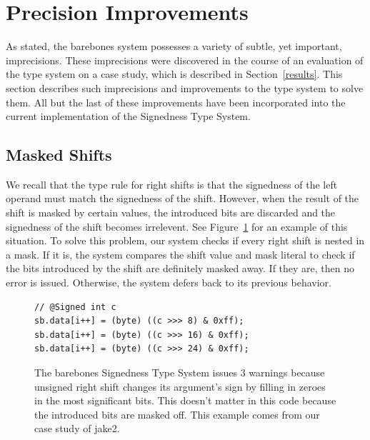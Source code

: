 \newpage
\section{Precision Improvements} \label{precision}

As stated, the barebones system possesses
a variety of subtle, yet important, imprecisions.
These imprecisions were discovered in the course of
an evaluation of the type system on a case study, which is described in
Section~\ref{results}. This section describes such imprecisions and improvements
to the type system to solve them. All but the last of these improvements have
been incorporated into the current implementation of the Signedness Type System.

\subsection{Masked Shifts}
We recall that the type rule for right shifts is that the signedness of the left
operand must match the signedness of the shift. However, when the result of the
shift is masked by certain values, the introduced bits are discarded and the
signedness of the shift becomes irrelevent. See Figure~\ref{fig:maskedshift}
for an example of this situation. To solve this problem, our system checks if
every right shift is nested in a mask. If it is, the system compares the shift
value and mask literal to check if the bits introduced by the shift are definitely
masked away.
If they are, then no error is issued. Otherwise, the system defers back to its previous
behavior.

\begin{figure}[h]
\begin{lstlisting}
// @Signed int c
sb.data[i++] = (byte) ((c >>> 8) & 0xff);
sb.data[i++] = (byte) ((c >>> 16) & 0xff);
sb.data[i++] = (byte) ((c >>> 24) & 0xff);

\end{lstlisting}
\vspace{-10pt}
\caption{
The barebones Signedness Type System issues 3 warnings because
unsigned right shift changes its argument's sign
by filling in zeroes in the most significant bits.
This doesn't matter in this code because the introduced bits
are masked off. This example comes from our case study of jake2.}
\label{fig:maskedshift}
\end{figure}

